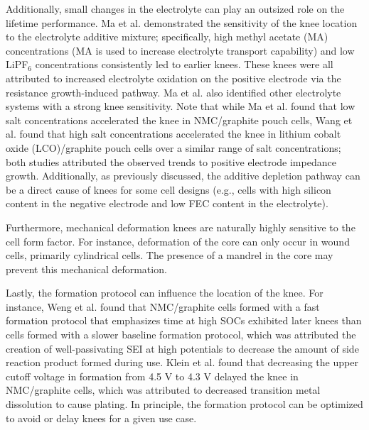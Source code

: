 \documentclass[journal=jpclcd,manuscript=article]{achemso}
\begin{document}
Additionally, small changes in the electrolyte can play an outsized role on the lifetime performance. Ma et al.\cite{ma_editors_2019} demonstrated the sensitivity of the knee location to the electrolyte additive mixture; specifically, high methyl acetate (MA) concentrations (MA is used to increase electrolyte transport capability) and low LiPF$_6$ concentrations consistently led to earlier knees. These knees were all attributed to increased electrolyte oxidation on the positive electrode via the resistance growth-induced pathway. Ma et al.\cite{ma_editors_2019} also identified other electrolyte systems with a strong knee sensitivity.
Note that while Ma et al.\cite{ma_editors_2019} found that low salt concentrations accelerated the knee in NMC/graphite pouch cells,
Wang et al.\cite{wang_systematic_2014} found that high salt concentrations accelerated the knee in lithium cobalt oxide (LCO)/graphite pouch cells over a similar range of salt concentrations; both studies attributed the observed trends to positive electrode impedance growth.
Additionally, as previously discussed, the additive depletion pathway can be a direct cause of knees for some cell designs (e.g., cells with high silicon content in the negative electrode and low FEC content in the electrolyte).\cite{petibon_studies_2016, jung_consumption_2016}

Furthermore, mechanical deformation knees are naturally highly sensitive to the cell form factor. For instance, deformation of the core \cite{pfrang_long-term_2018,carter_mechanical_2019,willenberg_development_2020} can only occur in wound cells, primarily cylindrical cells. The presence of a mandrel in the core may prevent this mechanical deformation.\cite{carter_mechanical_2019}

Lastly, the formation protocol can influence the location of the knee. For instance, Weng et al.\cite{weng_predicting_2021} found that NMC/graphite cells formed with a fast formation protocol that emphasizes time at high SOCs exhibited later knees than cells formed with a slower baseline formation protocol, which was attributed the creation of well-passivating SEI at high potentials to decrease the amount of side reaction product formed during use.\cite{attia_benefits_2021}
Klein et al.\cite{klein_demonstrating_2021} found that decreasing the upper cutoff voltage in formation from 4.5 V to 4.3 V delayed the knee in NMC/graphite cells, which was attributed to decreased transition metal dissolution to cause plating. In principle, the formation protocol can be optimized to avoid or delay knees for a given use case. 
\end{document}
